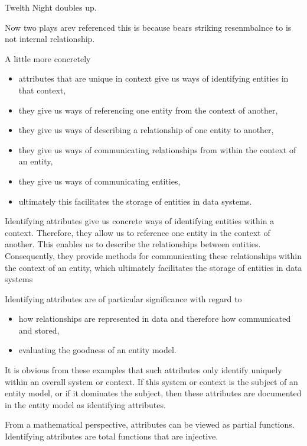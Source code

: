 Twelth Night doubles up.



Now two plays arev referenced this is because bears striking resenmbalnce to is not internal relationship.

\mynote A little more concretely 
\begin{itemize}
\item attributes that are unique in context give us ways of identifying entities in that context, 
\item they give us ways of referencing one entity from the context of another, 
\item they give us ways of describing a relationship of one entity to another,
\item they give us ways of communicating relationships from within the context of an entity,
\item they give us ways of communicating entities, 
\item ultimately this facilitates the storage of entities in data systems. 
\end{itemize}

\mynote
Identifying attributes give us concrete ways of identifying entities within a context. Therefore, they allow us to reference one entity in the context of another. This enables us to describe the relationships between entities. Consequently, they provide methods for communicating these relationships within the context of an entity, which ultimately facilitates the storage of entities in data systems

\mynote Identifying attributes are of particular significance with regard to 
\begin{itemize}
	\item how relationships are represented in data and therefore how communicated and stored,
	\item evaluating the goodness of an entity model.
\end{itemize}  

\mynote
It is obvious from these examples that such attributes only identify uniquely within an overall system or context. If this system or context is the subject of an entity model, or if it dominates the subject, then these attributes are documented in the entity model as identifying attributes. 

\mynote From a mathematical perspective, attributes can be viewed as partial functions. Identifying attributes are total functions that are injective.  

